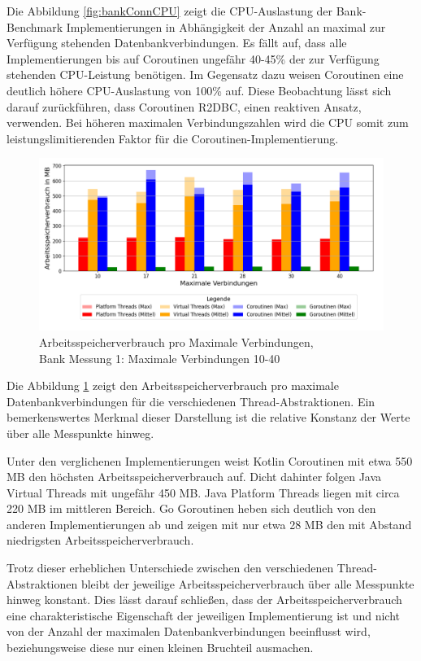 \documentclass[fontsize=12pt,paper=a4,twoside=semi,parskip=half-,headsepline,headinclude]{scrreprt}
\begin{document}
Die Abbildung \ref{fig:bankConnCPU} zeigt die CPU-Auslastung der Bank-Benchmark Implementierungen in Abhängigkeit der Anzahl an maximal zur Verfügung stehenden Datenbankverbindungen. Es fällt auf, dass alle Implementierungen bis auf Coroutinen ungefähr 40-45\% der zur Verfügung stehenden CPU-Leistung benötigen. Im Gegensatz dazu weisen Coroutinen eine deutlich höhere CPU-Auslastung von 100\% auf. Diese Beobachtung lässt sich darauf zurückführen, dass Coroutinen R2DBC, einen reaktiven Ansatz, verwenden. Bei höheren maximalen Verbindungszahlen wird die CPU somit zum leistungslimitierenden Faktor für die Coroutinen-Implementierung.

\begin{figure}[H]
	\centering
	\includegraphics[scale=0.5]{figures/bank/connections10-40/memory_usage_bar_plot.png}
	\caption{Arbeitsspeicherverbrauch pro Maximale Verbindungen,\\ Bank Messung 1: Maximale Verbindungen 10-40}
	\label{fig:bankConnRAM}
\end{figure}

Die Abbildung \ref{fig:bankConnRAM} zeigt den Arbeitsspeicherverbrauch pro maximale Datenbankverbindungen für die verschiedenen Thread-Abstraktionen. Ein bemerkenswertes Merkmal dieser Darstellung ist die relative Konstanz der Werte über alle Messpunkte hinweg.

Unter den verglichenen Implementierungen weist Kotlin Coroutinen mit etwa 550 MB den höchsten Arbeitsspeicherverbrauch auf. Dicht dahinter folgen Java Virtual Threads mit ungefähr 450 MB. Java Platform Threads liegen mit circa 220 MB im mittleren Bereich. Go Goroutinen heben sich deutlich von den anderen Implementierungen ab und zeigen mit nur etwa 28 MB den mit Abstand niedrigsten Arbeitsspeicherverbrauch.

Trotz dieser erheblichen Unterschiede zwischen den verschiedenen Thread-Abstraktionen bleibt der jeweilige Arbeitsspeicherverbrauch über alle Messpunkte hinweg konstant. Dies lässt darauf schließen, dass der Arbeitsspeicherverbrauch eine charakteristische Eigenschaft der jeweiligen Implementierung ist und nicht von der Anzahl der maximalen Datenbankverbindungen beeinflusst wird, beziehungsweise diese nur einen kleinen Bruchteil ausmachen.
\end{document}
